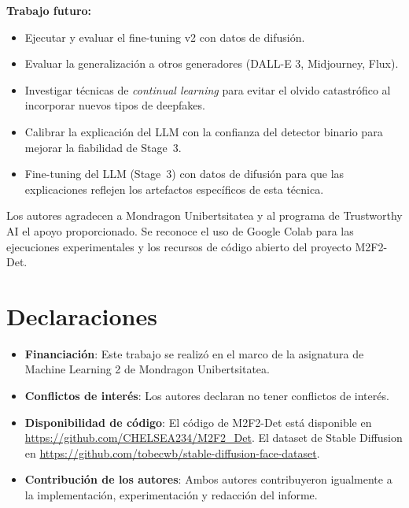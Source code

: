 \documentclass[pdflatex,sn-mathphys-num]{sn-jnl}
\begin{document}
\textbf{Trabajo futuro:}
\begin{itemize}
    \item Ejecutar y evaluar el fine-tuning v2 con datos de difusión.
    \item Evaluar la generalización a otros generadores (DALL-E 3, Midjourney, Flux).
    \item Investigar técnicas de \emph{continual learning} para evitar el olvido catastrófico al incorporar nuevos tipos de deepfakes.
    \item Calibrar la explicación del LLM con la confianza del detector binario para mejorar la fiabilidad de Stage~3.
    \item Fine-tuning del LLM (Stage~3) con datos de difusión para que las explicaciones reflejen los artefactos específicos de esta técnica.
\end{itemize}


\backmatter


Los autores agradecen a Mondragon Unibertsitatea y al programa de Trustworthy AI el apoyo proporcionado. Se reconoce el uso de Google Colab para las ejecuciones experimentales y los recursos de código abierto del proyecto M2F2-Det.

\section*{Declaraciones}

\begin{itemize}
    \item \textbf{Financiación}: Este trabajo se realizó en el marco de la asignatura de Machine Learning 2 de Mondragon Unibertsitatea.
    \item \textbf{Conflictos de interés}: Los autores declaran no tener conflictos de interés.
    \item \textbf{Disponibilidad de código}: El código de M2F2-Det está disponible en \url{https://github.com/CHELSEA234/M2F2_Det}. El dataset de Stable Diffusion en \url{https://github.com/tobecwb/stable-diffusion-face-dataset}.
    \item \textbf{Contribución de los autores}: Ambos autores contribuyeron igualmente a la implementación, experimentación y redacción del informe.
\end{itemize}
\end{document}
